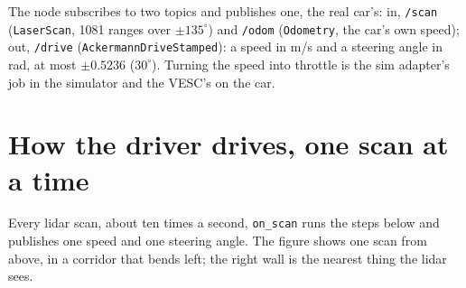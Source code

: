 \medskip
The node subscribes to two topics and publishes one, the real car's: in, \texttt{/scan}
(\texttt{LaserScan}, 1081 ranges over $\pm135^\circ$) and \texttt{/odom} (\texttt{Odometry}, the
car's own speed); out, \texttt{/drive} (\texttt{AckermannDriveStamped}): a speed in m/s and a
steering angle in rad, at most $\pm 0.5236$ ($30^\circ$). Turning the speed into throttle is the
sim adapter's job in the simulator and the VESC's on the car.

\section{How the driver drives, one scan at a time}
\label{app:driver}

Every lidar scan, about ten times a second, \texttt{on\_scan} runs the steps below and
publishes one speed and one steering angle. The figure shows one scan from above, in a corridor that bends left; the right wall is the nearest thing the lidar sees.

